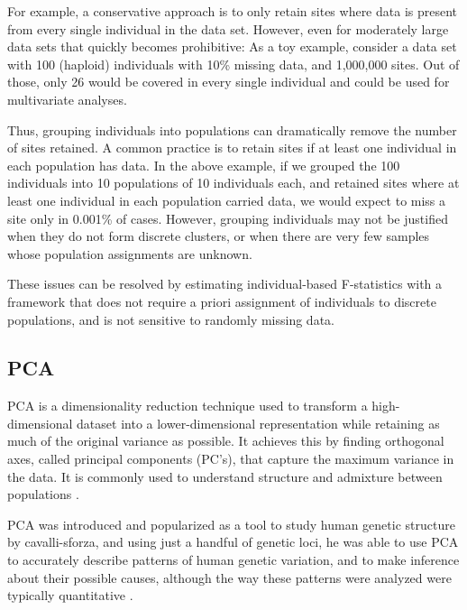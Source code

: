 \documentclass[12pt, letterpaper]{article}
\begin{document}
For example, a conservative approach is to only retain sites where data is present from every single individual in the data set. However, even for moderately large data sets that quickly becomes prohibitive: As a toy example, consider a data set with 100 (haploid) individuals with 10\% missing data, and 1,000,000 sites. Out of those, only 26 would be covered in every single individual and could be used for multivariate analyses. 

Thus, grouping individuals into populations can dramatically remove the number of sites retained. A common practice is to retain sites if at least one individual in each population has data. In the above example, if we grouped the 100 individuals into 10 populations of 10 individuals each, and retained sites where at least one individual in each population carried data, we would expect to miss a site only in 0.001\% of cases. However, grouping individuals may not be justified when they do not form discrete clusters, or when there are very few samples whose population assignments are unknown.

These issues can be resolved by estimating individual-based F-statistics with a framework that does not require a priori assignment of individuals to discrete populations, and is not sensitive to randomly missing data.


\subsection{PCA}

PCA is a dimensionality reduction technique used to transform a high-dimensional dataset into a lower-dimensional representation while retaining as much of the original variance as possible. It achieves this by finding orthogonal axes, called principal components (PC's), that capture the maximum variance in the data. It is commonly used to understand structure and admixture between populations \cite{patterson_population_2006,novembre_genes_2008,noauthor_cavalli-sforza_nodate,mcvean_genealogical_2009,brisbin_pcadmix_2012}. 

PCA was introduced and popularized as a tool to study human genetic structure by cavalli-sforza, and using just a handful of genetic loci, he was able to use PCA to accurately describe patterns of human genetic variation, and to make inference about their possible causes, although the way these patterns were analyzed were typically quantitative \cite{menozzi_synthetic_1978, sforza_great_1995, noauthor_cavalli-sforza_nodate}.
\end{document}
